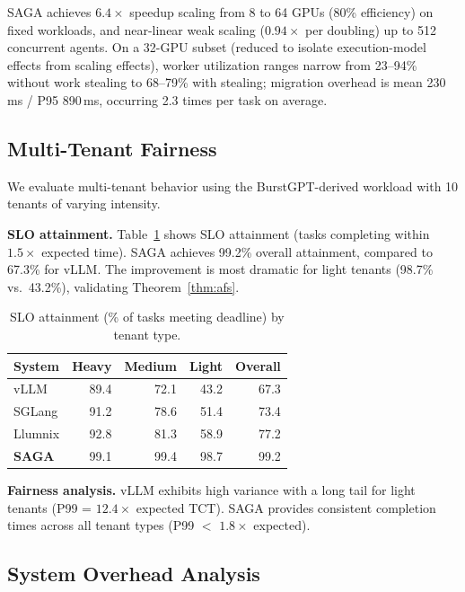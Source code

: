 \documentclass[sigconf]{acmart}
\newcommand{\sysname}{SAGA\xspace}
\begin{document}
\sysname achieves $6.4\times$ speedup scaling from 8 to 64 GPUs (80\% efficiency) on fixed workloads, and near-linear weak scaling ($0.94\times$ per doubling) up to 512 concurrent agents. On a 32-GPU subset (reduced to isolate execution-model effects from scaling effects), worker utilization ranges narrow from 23--94\% without work stealing to 68--79\% with stealing; migration overhead is mean 230\,ms / P95 890\,ms, occurring 2.3 times per task on average. \label{sec:stealing-eval}

\subsection{Multi-Tenant Fairness}
\label{sec:fairness-eval}

We evaluate multi-tenant behavior using the BurstGPT-derived workload with 10 tenants of varying intensity.

\textbf{SLO attainment.} Table~\ref{tab:fairness} shows SLO attainment (tasks completing within $1.5\times$ expected time). \sysname achieves 99.2\% overall attainment, compared to 67.3\% for vLLM. The improvement is most dramatic for light tenants (98.7\% vs.\ 43.2\%), validating Theorem~\ref{thm:afs}.

\begin{table}[t]
    \centering
    \caption{SLO attainment (\% of tasks meeting deadline) by tenant type.}
    \label{tab:fairness}
    \begin{tabular}{lrrrr}
    \toprule
    \textbf{System} & \textbf{Heavy} & \textbf{Medium} & \textbf{Light} & \textbf{Overall} \\
    \midrule
    vLLM & 89.4 & 72.1 & 43.2 & 67.3 \\
    SGLang & 91.2 & 78.6 & 51.4 & 73.4 \\
    Llumnix & 92.8 & 81.3 & 58.9 & 77.2 \\
    \textbf{\sysname} & 99.1 & 99.4 & 98.7 & 99.2 \\
    \bottomrule
    \end{tabular}
\end{table}

\textbf{Fairness analysis.} vLLM exhibits high variance with a long tail for light tenants (P99 = $12.4\times$ expected TCT). \sysname provides consistent completion times across all tenant types (P99 $<$ $1.8\times$ expected).

\subsection{System Overhead Analysis}
\label{sec:overhead}
\end{document}
